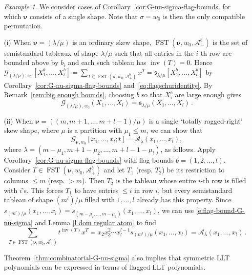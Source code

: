 \documentclass[12pt]{amsart}
\theoremstyle{definition}
\theoremstyle{remark}
\newtheorem{example}[thm]{Example}
\newcommand{\sfrak}{{\mathfrak s}}
\newcommand{\nubold}{{\boldsymbol \nu }}
\newcommand{\Acal}{{\mathcal A}}
\newcommand{\Gcal}{{\mathcal G}}
\DeclareMathOperator{\inv}{inv}
\DeclareMathOperator{\FSST}{FST}
\begin{document}
\begin{example}\label{ex:nu=single-diagram}
We consider cases of Corollary~\ref{cor:G-nu-sigma-flag-bounds} for
which $\nubold$ consists of a single shape. Note that $\sigma=w_0$ is
then the only compatible permutation.

(i) When $\nubold = (\lambda/\mu)$ is an ordinary skew shape,
$\FSST(\nubold,w_0,\Acal ^{b}_{+})$ is the set of semistandard
tableaux of shape $\lambda/\mu$ such that all entries in the $i$-th
row are bounded above by $b_i$ and each such tableau has $\inv(T) =
0$.  Hence $\Gcal_{(\lambda/\mu),w_0}[X_1^b,\ldots,X_l^b] = \sum_{T
\in \FSST(\nubold,w_0,\Acal_+^b)} x^T =
\sfrak_{\lambda/\mu}[X_1^b,\ldots,X_l^b]$ by
Corollary~\ref{cor:G-nu-sigma-flag-bounds}
and~\eqref{eq:flagschuridentity}.  By Remark~\ref{rem:big enough
bounds}, choosing $b$ so that $X_i^b$ are large enough gives
\begin{equation}
\Gcal_{(\lambda/\mu),w_0}(X_1,\dots, X_l)=\sfrak_{\lambda/\mu}(X_1,
\dots, X_l)\,.
\end{equation}

(ii) When $\nubold=((m,m+1,\ldots,m+l-1)/\mu)$ is a single `totally
ragged-right' skew shape, where $\mu$ is a partition with $\mu_1 \le
m$, we can show that
\begin{equation}\label{e:total-ragged}
\Gcal_{\nubold, w_0}[x_1, \dots, x_l; t]  = \Acal_{\lambda}(x_1,\dots, x_l),
\end{equation}
where $\lambda = (m-\mu_1, m+1-\mu_2, \dots, m+l-1-\mu_l)$, as
follows.  Apply Corollary~\ref{cor:G-nu-sigma-flag-bounds} with flag
bounds $b = (1,2,\dots, l)$.  Consider $T\in\FSST(\nubold,w_0,\mathcal
A_+^b)$ and let $T_1$ (resp. $T_2$) be its restriction to columns $\le
m$ (resp. \(> m\)).  Then $T_2$ is the tableau whose entire $i$-th row
is filled with $i$'s.  This forces $T_1$ to have entries $\le i$ in
row $i$, but every semistandard tableau of shape $(m^l)/\mu$ filled
with $1,\dots, l$ already has this property.  Since
$s_{(m^{l})/\mu}(x_1,\dots, x_l)= s_{(m-\mu_l, \dots,
m-\mu_1)}(x_1,\dots, x_l)$, we can use \eqref{e:flag-bound-G-nu-sigma}
and Lemma \ref{l dom regular atom} to find
\begin{equation}\label{e:total-ragged-2}
\sum_{T\in\FSST(\nubold,w_0,\Acal_+^b)} t^{\inv(T)} x^T = x_2 x_3^2
\cdots x_l^{l-1} s_{(m^{l})/\mu}(x_1,\dots, x_l) =
\Acal_{\lambda}(x_1, \dots, x_l)\,.
\end{equation}
\end{example}


Theorem~\ref{thm:combinatorial-G-nu-sigma} also implies that symmetric
LLT polynomials can be expressed in terms of flagged LLT polynomials.
\end{document}
